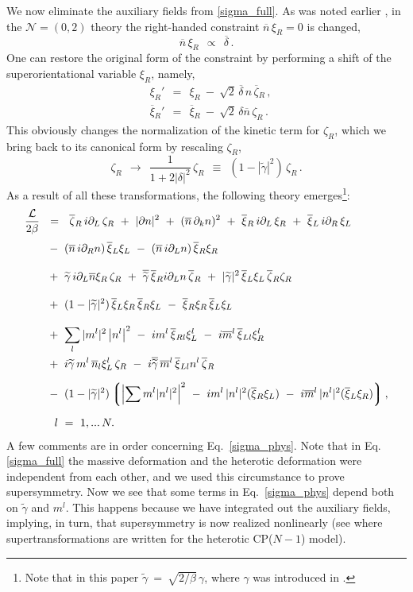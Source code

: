 \documentclass[12pt]{article}
\newcommand{\ntwoo}{${\mathcal N}= \left(0,2\right) $ }
\newcommand{\p}{\partial}
\newcommand{\wt}{\widetilde}
\newcommand{\ov}{\overline}
\newcommand{\mc}[1]{\mathcal{#1}}
\newcommand{\lgr}{\left\lgroup}
\newcommand{\rgr}{\right\rgroup}
\newcommand{\bxir}{\ov{\xi}{}_R}
\newcommand{\bxil}{\ov{\xi}{}_L}
\newcommand{\xir}{\xi_R}
\newcommand{\xil}{\xi_L}
\newcommand{\bzr}{\ov{\zeta}{}_R}
\newcommand{\zr}{\zeta_R}
\newcommand{\nbar}{\ov{n}}
\newcommand{\tgamma}{\wt{\gamma}}
\begin{document}
        We now eliminate the auxiliary fields from \eqref{sigma_full}. 
        As was noted earlier \cite{Edalati}, in the \ntwoo theory the right-handed constraint $ \nbar\,\xir = 0 $ is
changed,
\[
	\nbar\, \xir ~~\propto~~ \ov{\delta}\,.
\]
One can restore the original form of 
the constraint  by performing a shift of the superorientational variable $ \xir $, namely,
\begin{align*}
%
	& \xi_R' ~~=~~ \xir ~-~ \sqrt{2}\, \ov{\delta}\, n\, \bzr \,, \\[1mm]
%
	& \ov{\xi}{}_R' ~~=~~ \bxir ~-~ \sqrt{2}\, \delta \nbar\, \zr\,.
\end{align*}
	This obviously changes the normalization of the kinetic term for $ \zr $, which we
	bring back to its canonical form by rescaling $ \zr $,
\[
	\zr ~~\to~~ \frac{1}{1 + 2|\delta|^2}\,\zr ~~\equiv~~ ( 1 - |\tgamma|^2 )\, \zr\,.
\]
As a result of all these transformations,  the following theory emerges\footnote{Note that in 
this paper $ \tgamma ~=~ \sqrt{2/\beta}\,\gamma $, where 
$\gamma$ was introduced in \cite{SYhet}.}:
\begin{align}
%
\notag
	\frac{\mc{L}}{2\beta} & ~~=~~ \bzr\, i\p_L\, \zr ~+~ 
		| \p n |^2  ~+~ (\nbar\, \p_k n)^2 ~+~ \bxir\, i\p_L\, \xir ~+~ \bxil\, i\p_R\, \xil
	\\[1mm]
%
\notag
	&~ 
	~-~ (\nbar\, i\p_R n)\, \bxil \xil ~-~  (\nbar\, i\p_L n)\, \bxir \xir
	\\[3mm]
%
\notag
	&~
	~+~ \tgamma\, i\p_L\nbar \xir\, \zr ~+~ \ov{\tgamma}\, \bxir i\p_L n\, \bzr
	~+~ |\tgamma|^2\, \bxil \xil\, \bzr \zr
	\\[3mm]
%
\label{sigma_phys}
	&~
	~+~ (1-|\tgamma|^2)\,\bxil\xir\,\bxir\xil ~-~ \bxir\xir\,\bxil\xil
	\\[3mm]
%	
\notag
	&~
	~+~ \sum_l |m^l|^2 \left|n^l \right|^2 
	~-~ i m^l\, \ov{\xi}{}_{Rl} \xi_L^l ~-~ i\ov{m}{}^l\, \ov{\xi}{}_{Ll} \xi_R^l
	\\
%
\notag
	&~
	~+~ i\tgamma\, m^l\, \ov{n}{}_l \xi_L^l\, \zr 
	~-~ i\ov{\tgamma}\, \ov{m}{}^l\, \ov{\xi}{}_{Ll} n^l\, \bzr
	\\[2mm]
%
\notag
	&~
	~-~ (1-|\tgamma|^2)
	\lgr \left|\sum m^l |n^l|^2 \right|^2 
		~-~ i m^l\, |n^l|^2 (\bxir\xil) ~-~ i\ov{m}{}^l\, |n^l|^2(\bxil\xir)
	\rgr ,
	\\[2mm]
%
\notag
	&
	~~~~  l ~=~ 1,...\,N.
\end{align}	
	A few comments are in order concerning Eq.~\eqref{sigma_phys}. 
	Note that in Eq. \eqref{sigma_full} the massive deformation and the heterotic deformation
	were independent from each other, and we used this
	circumstance to prove supersymmetry.
	Now we see that some terms in Eq.~\eqref{sigma_phys}  depend both on $\tgamma$ and
	$m^l$.
	This happens because we have integrated out the auxiliary fields, implying, in turn,  
 that supersymmetry is now realized nonlinearly 
	(see \cite{BSYhet} where supertransformations are written for the
	heterotic CP($N-1$) model).
\end{document}

